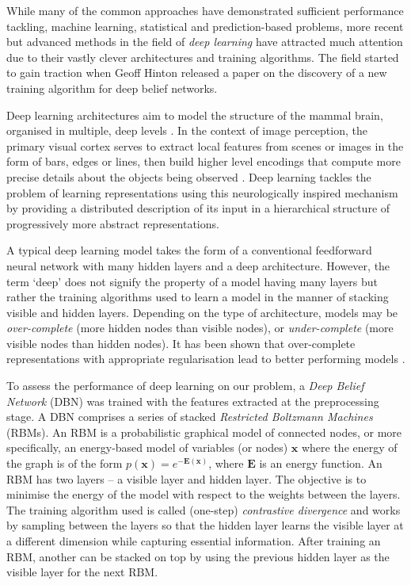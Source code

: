 \documentclass[a4paper, 11pt, twocolumn]{report}
\begin{document}
While many of the common approaches have demonstrated sufficient performance tackling, machine learning, statistical and prediction-based problems, more recent but advanced methods in the field of \textit{deep learning} have attracted much attention due to their vastly clever architectures and training algorithms.
The field started to gain traction when Geoff Hinton \cite{hinton2006fast} released a paper on the discovery of a new training algorithm for deep belief networks.

Deep learning architectures aim to model the structure of the mammal brain, organised in multiple, deep levels \cite{serre2007quantitative}.
In the context of image perception, the primary visual cortex serves to extract local features from scenes or images in the form of bars, edges or lines, then build higher level encodings that compute more precise details about the objects being observed \cite{lee1998role}.
Deep learning tackles the problem of learning representations using this neurologically inspired mechanism by providing a distributed description of its input in a hierarchical structure of progressively more abstract representations.

A typical deep learning model takes the form of a conventional feedforward neural network with many hidden layers and a deep architecture.
However, the term `deep' does not signify the property of a model having many layers but rather the training algorithms used to learn a model in the manner of stacking visible and hidden layers.
Depending on the type of architecture, models may be \textit{over-complete} (more hidden nodes than visible nodes), or \textit{under-complete} (more visible nodes than hidden nodes).
It has been shown that over-complete representations with appropriate regularisation lead to better performing models \cite{vincent2010stacked}.

To assess the performance of deep learning on our problem, a \textit{Deep Belief Network} (DBN) was trained with the features extracted at the preprocessing stage.
A DBN comprises a series of stacked \textit{Restricted Boltzmann Machines} (RBMs).
An RBM is a probabilistic graphical model of connected nodes, or more specifically, an energy-based model of variables (or nodes) $\mathbf{x}$ where the energy of the graph is of the form $p(\mathbf{x})=e^{\mathbf{-E(x)}}$, where $\mathbf{E}$ is an energy function.
An RBM has two layers -- a visible layer and hidden layer.
The objective is to minimise the energy of the model with respect to the weights between the layers.
The training algorithm used is called (one-step) \textit{contrastive divergence} \cite{hinton2002training} and works by sampling between the layers so that the hidden layer learns the visible layer at a different dimension while capturing essential information.
After training an RBM, another can be stacked on top by using the previous hidden layer as the visible layer for the next RBM.
\end{document}
